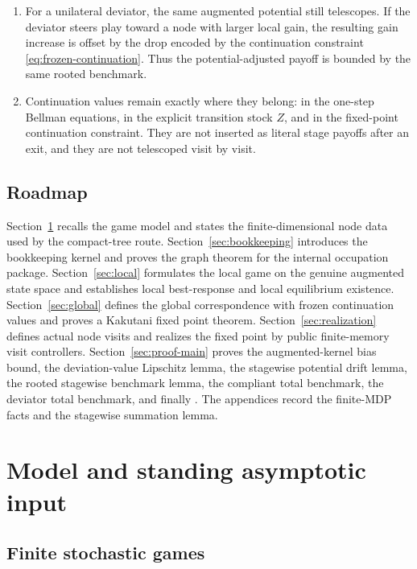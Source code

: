 \documentclass[12pt]{article}
\theoremstyle{definition}
\newcommand{\1}{\mathbf{1}}
\begin{document}
\begin{enumerate}[label=\textnormal{(\arabic*)},leftmargin=2.4em]
\item For a unilateral deviator, the same augmented potential still telescopes.
If the deviator steers play toward a node with larger local gain, the resulting
gain increase is offset by the drop encoded by the continuation constraint
\eqref{eq:frozen-continuation}. Thus the potential-adjusted payoff is bounded by
the same rooted benchmark.

\item Continuation values remain exactly where they belong: in the one-step
Bellman equations, in the explicit transition stock $Z$, and in the fixed-point
continuation constraint. They are not inserted as literal stage payoffs after an
exit, and they are not telescoped visit by visit.
\end{enumerate}

\subsection{Roadmap}



Section~\ref{sec:model} recalls the game model and states the finite-dimensional
node data used by the compact-tree route. Section~\ref{sec:bookkeeping}
introduces the bookkeeping kernel and proves the graph theorem for the internal
occupation package. Section~\ref{sec:local} formulates the local game on the
genuine augmented state space and establishes local best-response and local
equilibrium existence. Section~\ref{sec:global} defines the global correspondence
with frozen continuation values and proves a Kakutani fixed point theorem.
Section~\ref{sec:realization} defines actual node visits and realizes the fixed
point by public finite-memory visit controllers. Section~\ref{sec:proof-main}
proves the augmented-kernel bias bound, the deviation-value Lipschitz lemma, the
stagewise potential drift lemma, the rooted stagewise benchmark lemma, the
compliant total benchmark, the deviator total benchmark, and finally
. The appendices record the finite-MDP facts and the stagewise
summation lemma.

\section{Model and standing asymptotic input}
\label{sec:model}

\subsection{Finite stochastic games}
\end{document}
